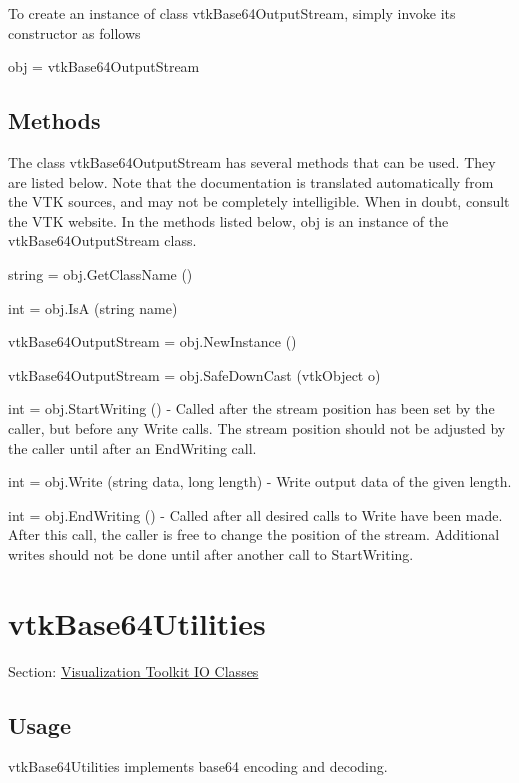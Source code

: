 To create an instance of class vtk\-Base64\-Output\-Stream, simply invoke its constructor as follows \begin{DoxyVerb}  obj = vtkBase64OutputStream
\end{DoxyVerb}
 \hypertarget{vtkwidgets_vtkxyplotwidget_Methods}{}\subsection{Methods}\label{vtkwidgets_vtkxyplotwidget_Methods}
The class vtk\-Base64\-Output\-Stream has several methods that can be used. They are listed below. Note that the documentation is translated automatically from the V\-T\-K sources, and may not be completely intelligible. When in doubt, consult the V\-T\-K website. In the methods listed below, {\ttfamily obj} is an instance of the vtk\-Base64\-Output\-Stream class. 
\begin{DoxyItemize}
\item {\ttfamily string = obj.\-Get\-Class\-Name ()}  
\item {\ttfamily int = obj.\-Is\-A (string name)}  
\item {\ttfamily vtk\-Base64\-Output\-Stream = obj.\-New\-Instance ()}  
\item {\ttfamily vtk\-Base64\-Output\-Stream = obj.\-Safe\-Down\-Cast (vtk\-Object o)}  
\item {\ttfamily int = obj.\-Start\-Writing ()} -\/ Called after the stream position has been set by the caller, but before any Write calls. The stream position should not be adjusted by the caller until after an End\-Writing call.  
\item {\ttfamily int = obj.\-Write (string data, long length)} -\/ Write output data of the given length.  
\item {\ttfamily int = obj.\-End\-Writing ()} -\/ Called after all desired calls to Write have been made. After this call, the caller is free to change the position of the stream. Additional writes should not be done until after another call to Start\-Writing.  
\end{DoxyItemize}\hypertarget{vtkio_vtkbase64utilities}{}\section{vtk\-Base64\-Utilities}\label{vtkio_vtkbase64utilities}
Section\-: \hyperlink{sec_vtkio}{Visualization Toolkit I\-O Classes} \hypertarget{vtkwidgets_vtkxyplotwidget_Usage}{}\subsection{Usage}\label{vtkwidgets_vtkxyplotwidget_Usage}
vtk\-Base64\-Utilities implements base64 encoding and decoding.

